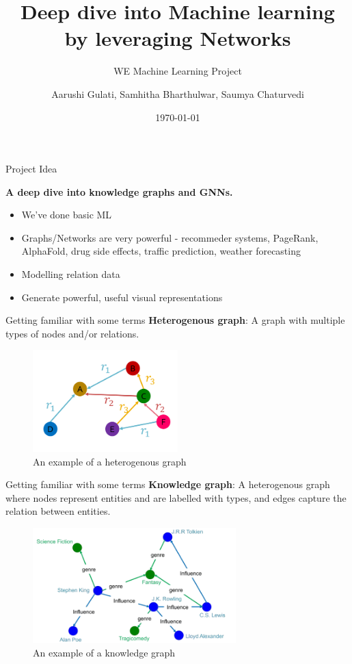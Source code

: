\documentclass{beamer}
\title{Deep dive into Machine learning by leveraging Networks}
\subtitle{WE Machine Learning Project}
\author{Aarushi Gulati, Samhitha Bharthulwar, Saumya Chaturvedi}
\institute{WE Program Cohort 4}
\date{\today}
\begin{document}
\begin{frame}
\titlepage
\end{frame}


\begin{frame}{Project Idea}
    \begin{center}
        {\large \textbf{A deep dive into knowledge graphs and GNNs.}}
    \end{center}

    \begin{itemize}
        \item We've done basic ML 
        \item Graphs/Networks are very powerful - recommeder systems, PageRank, AlphaFold, drug side effects, traffic prediction, weather forecasting
        \item Modelling relation data
        \item Generate powerful, useful visual representations
    \end{itemize}
\end{frame}

\begin{frame}{Getting familiar with some terms}
    \textbf{Heterogenous graph}: A graph with multiple types of nodes and/or relations.
    \begin{figure}
        \includegraphics[width=0.5\textwidth]{attachments/diagram_heterogenous_graph.png}
        \caption{An example of a heterogenous graph \cite{course}}
        \label{fig:hg}
    \end{figure} 
\end{frame}

\begin{frame}{Getting familiar with some terms}
    \textbf{Knowledge graph}: A heterogenous graph where nodes represent entities and are labelled with types, and edges capture the relation between entities.
    \begin{figure}
            \includegraphics[width=0.7\textwidth]{attachments/diagram_kg.png}
            \caption{An example of a knowledge graph \cite{course}}
            \label{fig:kg}
    \end{figure}
\end{frame}
\end{document}
